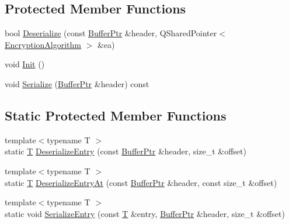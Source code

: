 \subsection*{Protected Member Functions}
\begin{DoxyCompactItemize}
\item 
bool \hyperlink{class_gost_crypt_1_1_volume_1_1_volume_header_a9352d16b503f35338e5f6d6deb12f455}{Deserialize} (const \hyperlink{class_gost_crypt_1_1_buffer_ptr}{Buffer\+Ptr} \&header, Q\+Shared\+Pointer$<$ \hyperlink{class_gost_crypt_1_1_volume_1_1_encryption_algorithm}{Encryption\+Algorithm} $>$ \&ea)
\item 
void \hyperlink{class_gost_crypt_1_1_volume_1_1_volume_header_a05396de0817aef69d254c1df033c43fa}{Init} ()
\item 
void \hyperlink{class_gost_crypt_1_1_volume_1_1_volume_header_a4facba2c383fad43d9e7cb1a7930b195}{Serialize} (\hyperlink{class_gost_crypt_1_1_buffer_ptr}{Buffer\+Ptr} \&header) const
\end{DoxyCompactItemize}
\subsection*{Static Protected Member Functions}
\begin{DoxyCompactItemize}
\item 
{\footnotesize template$<$typename T $>$ }\\static \hyperlink{_stribog_8c_aba2f4c400d7a4c0bf0296be622087314}{T} \hyperlink{class_gost_crypt_1_1_volume_1_1_volume_header_a20f60406a12c3e996005a4093c19e438}{Deserialize\+Entry} (const \hyperlink{class_gost_crypt_1_1_buffer_ptr}{Buffer\+Ptr} \&header, size\+\_\+t \&offset)
\item 
{\footnotesize template$<$typename T $>$ }\\static \hyperlink{_stribog_8c_aba2f4c400d7a4c0bf0296be622087314}{T} \hyperlink{class_gost_crypt_1_1_volume_1_1_volume_header_a7698d95b13fc25bb977069309742844a}{Deserialize\+Entry\+At} (const \hyperlink{class_gost_crypt_1_1_buffer_ptr}{Buffer\+Ptr} \&header, const size\+\_\+t \&offset)
\item 
{\footnotesize template$<$typename T $>$ }\\static void \hyperlink{class_gost_crypt_1_1_volume_1_1_volume_header_ab08ed660900880c76f5b0aa5ed627a94}{Serialize\+Entry} (const \hyperlink{_stribog_8c_aba2f4c400d7a4c0bf0296be622087314}{T} \&entry, \hyperlink{class_gost_crypt_1_1_buffer_ptr}{Buffer\+Ptr} \&header, size\+\_\+t \&offset)
\end{DoxyCompactItemize}
